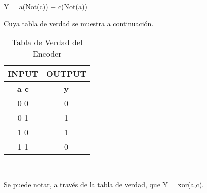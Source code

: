 \begin{center}
Y = a(Not(c)) + c(Not(a))
\end{center}
Cuya tabla de verdad se muestra a continuaci\'on.
\begin{center}
	\begin{table}[h!]
		\begin{center}
			\caption{Tabla de Verdad del Encoder}
			\begin{tabular}{|c|c|}
				\hline
				\textbf{INPUT} & \textbf{OUTPUT} \\
				\hline
				\textbf{a c} & \textbf{y} \\
				\hline
				0 0 & 0\\
				\hline
				0 1 & 1 \\
				\hline
				1 0 & 1\\
				\hline
				1 1 & 0\\
				\hline
			\end{tabular} \\
		\end{center}
	\end{table}
\end{center}
Se puede notar, a trav\'es de la tabla de verdad, que Y = xor(a,c).